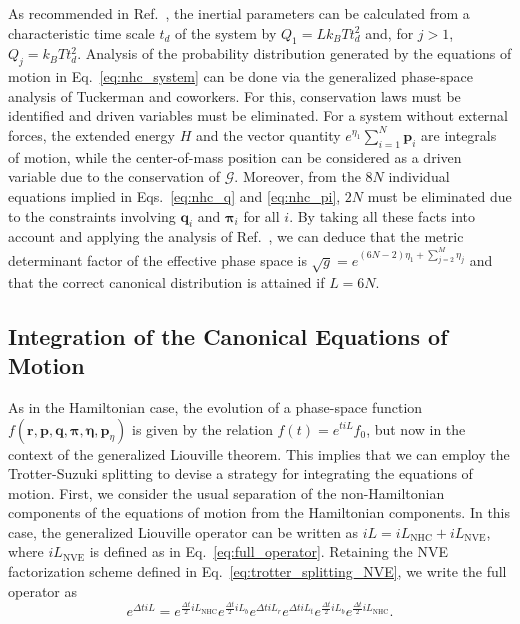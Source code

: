 \documentclass[aip,jcp,reprint,amsmath,amssymb,raggedbottom]{revtex4-1}
\newcommand{\vt}[1]{\boldsymbol{\mathbf{#1}}}           %
\begin{document}
As recommended in Ref.~, the inertial parameters can be calculated from a characteristic time scale $t_d$ of the system by $Q_1 = L k_B T t_d^2$ and, for $j > 1$, $Q_j = k_B T t_d^2$. Analysis of the probability distribution generated by the equations of motion in Eq.~\ref{eq:nhc_system} can be done via the generalized phase-space analysis of Tuckerman and coworkers.\cite{Tuckerman2001} For this, conservation laws must be identified and driven variables must be eliminated. For a system without external forces, the extended energy $H$ and the vector quantity $e^{\eta_1}\sum_{i=1}^N {\vt p}_i$ are integrals of motion, while the center-of-mass position can be considered as a driven variable due to the conservation of $\boldsymbol{\mathcal G}$.\cite{Tuckerman2001} Moreover, from the $8N$ individual equations implied in Eqs.~\ref{eq:nhc_q} and \ref{eq:nhc_pi}, $2N$ must be eliminated due to the constraints involving $\vt q_i$ and $\vt \pi_i$ for all $i$. By taking all these facts into account and applying the analysis of Ref.~, we can deduce that the metric determinant factor of the effective phase space is $\sqrt{g} = e^{(6N-2) \eta_1 + \sum_{j=2}^M \eta_j}$ and that the correct canonical distribution is attained if $L = 6N$.

\subsection{Integration of the Canonical Equations of Motion}

As in the Hamiltonian case, the evolution of a phase-space function $f(\vt r, \vt p, \vt q, \vt \pi, \vt \eta,{\vt p}_\eta)$ is given by the relation $f(t) = e^{t i\!L}f_0$, but now in the context of the generalized Liouville theorem.\cite{Tuckerman_1999, Tuckerman2001} This implies that we can employ the Trotter-Suzuki splitting to devise a strategy for integrating the equations of motion. First, we consider the usual separation of the non-Hamiltonian components of the equations of motion from the Hamiltonian components. In this case, the generalized Liouville operator can be written as $i\!L = i\!L_\text{NHC} + i\!L_\text{NVE}$, where $i\!L_\text{NVE}$ is defined as in Eq.~\ref{eq:full_operator}. Retaining the NVE factorization scheme defined in Eq.~\ref{eq:trotter_splitting_NVE}, we write the full operator as\cite{Martyna1996}
\begin{equation}
\label{eq:trotter_splitting_NHC}
e^{\Delta t i\!L} = e^{\frac{\Delta t}{2} i\!L_\text{NHC}} e^{\frac{\Delta t}{2} i\!L_b} e^{\Delta t i\!L_r} e^{\Delta t i\!L_t}  e^{\frac{\Delta t}{2} i\!L_b} e^{\frac{\Delta t}{2} i\!L_\text{NHC}}.
\end{equation}
\end{document}
